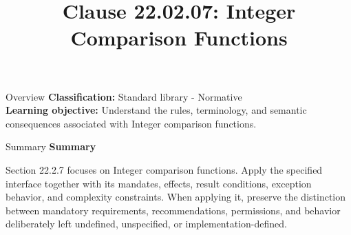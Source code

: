 \documentclass[10pt,letterpaper]{article}
\title{Clause 22.02.07: Integer Comparison Functions}
\author{}
\date{}
\begin{document}
\maketitle
\begin{CornellOverviewBox}{Overview}
\textbf{Classification:} Standard library - Normative\\[2pt]
\textbf{Learning objective:} Understand the rules, terminology, and semantic consequences associated with Integer comparison functions.
\end{CornellOverviewBox}\begin{CornellSummaryBox}{Summary}
{\sffamily\bfseries\color{Accent} Summary}\par\vspace{3pt}Section 22.2.7 focuses on Integer comparison functions. Apply the specified interface together with its mandates, effects, result conditions, exception behavior, and complexity constraints. When applying it, preserve the distinction between mandatory requirements, recommendations, permissions, and behavior deliberately left undefined, unspecified, or implementation-defined.
\end{CornellSummaryBox}
\end{document}
